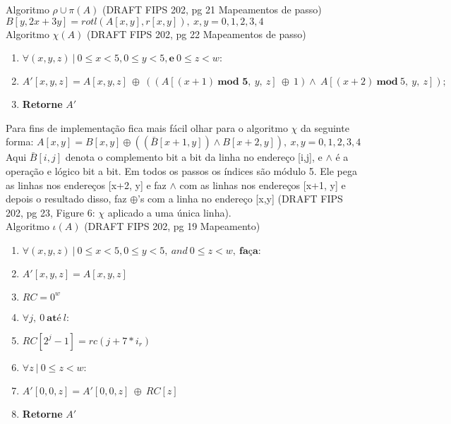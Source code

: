 \documentclass[12pt, a4paper]{article}
\begin{document}
\begin{enumerate}
\begin{enumerate}
Algoritmo $\rho \cup \pi(A)$ (DRAFT FIPS 202, pg 21 Mapeamentos de passo)\\
$B[y, 2x+3y] = rotl(A[x,y], r[x,y]),\ x,y=0,1,2,3,4$\\

Algoritmo $\chi(A)$ (DRAFT FIPS 202, pg 22 Mapeamentos de passo)
  \begin{enumerate}
    \item $\forall (x,y,z)\ |\ 0 \le x < 5, 0 \le y < 5, \textbf{e}\ 0 \le z
    < w:$

    \item[] \quad $A'[x,y,z] = A[x,y,z]\ \oplus\ ((A[(x+1)\ \textbf{mod 5},\
    y,\ z]\ \oplus\ 1) \land\ A[(x+2)\ \textbf{mod}\ 5,\ y,\ z]);$

    \item \textbf{Retorne} $A'$\\
  \end{enumerate}

Para fins de implementação fica mais fácil olhar para o algoritmo $\chi$ da
seguinte forma:
$A[x,y] = B[x,y] \oplus ((\bar{B}[x+1, y]) \land B[x+2, y]), \ x,y=0,1,2,3,4$\\

Aqui $\bar{B}[i,j]$ denota o complemento bit a bit da linha no endereço [i,j], e
$\land$ é a operação e lógico bit a bit. Em todos os passos os índices são
módulo 5. Ele pega as linhas nos endereços [x+2, y] e faz $\land$ com as linhas
nos endereços [x+1, y] e depois o resultado disso, faz $\oplus$'s com a linha no
endereço [x,y] (DRAFT FIPS 202, pg 23, Figure 6: $\chi$ aplicado a uma única
linha).\\

Algoritmo $\iota(A)$ (DRAFT FIPS 202, pg 19 Mapeamento)
  \begin{enumerate}
    \item $\forall (x,y,z)\ |\ 0 \le x < 5, 0 \le y < 5,\ and\ 0 \le z < w,\
    \textbf{faça}:$
    \item[] \quad $A'[x, y, z] = A[x, y, z]$
    \item $RC=0^{w}$
    \item $\forall j,\ 0\ \textbf{até}\ l:$
    \item[] \quad $RC[2^{j} - 1] = rc(j+7*i_{r})$
    \item $\forall z\ |\ 0 \le z < w:$
    \item[] \quad $A' [0, 0, z] = A'[0, 0, z]\ \oplus\ RC[z]$
    \item \textbf{Retorne} $A'$\\
  \end{enumerate}


\end{enumerate}
\end{enumerate}
\end{document}
